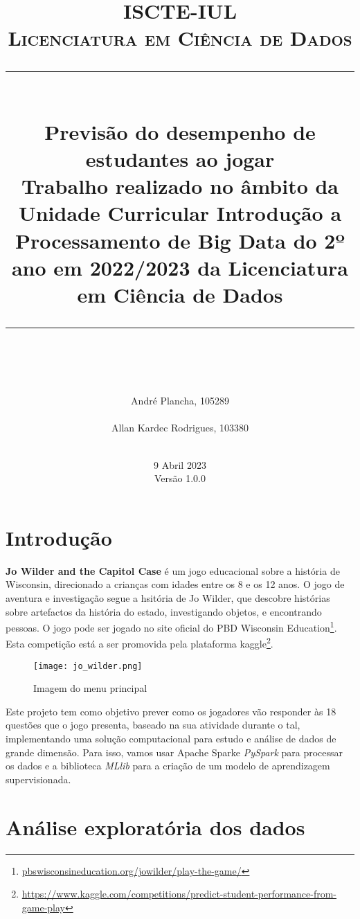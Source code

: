 \documentclass[justified, 11pt]{scrartcl}
\title{	
	\normalfont\normalsize
	\textsc{ISCTE-IUL \\ Licenciatura em Ciência de Dados}\\
	\vspace{20pt} 
	\rule{\linewidth}{0.5pt}\\
	\vspace{20pt}
	{\huge Previsão do desempenho de estudantes ao jogar}\\ 
  \vspace{16pt} 
  {\large Trabalho realizado no âmbito da Unidade Curricular Introdução a Processamento de Big Data do 2º ano em 2022/2023 da Licenciatura em Ciência de Dados}\\
	\vspace{12pt}
	\rule{\linewidth}{2pt}\\
	\vspace{20pt} 
}
\author{
  André Plancha, 105289 \\
  \email{Andre\_Plancha@iscte-iul.pt}\\
  Allan Kardec Rodrigues, 103380 \\
  \email{aksrs@iscte-iul.pt} \\
  \vspace{30pt}
}
\date{9 Abril 2023 \\ Versão 1.0.0}
\begin{document}
  \thispagestyle{empty}
  \maketitle
  \pagebreak
  \section{Introdução}
  \textbf{Jo Wilder and the Capitol Case} é um jogo educacional sobre a história de Wisconsin, direcionado a crianças com idades entre os 8 e os 12 anos. O jogo de aventura e investigação segue a hsitória de Jo Wilder, que descobre histórias sobre artefactos da história do estado, investigando objetos, e encontrando pessoas. O jogo pode ser jogado no site oficial do PBD Wisconsin Education\footnote{\url{pbswisconsineducation.org/jowilder/play-the-game/}}. Esta competição está a ser promovida pela plataforma kaggle\footnote{\url{https://www.kaggle.com/competitions/predict-student-performance-from-game-play}}.

  \begin{figure}[h]
    \centering
    \texttt{[image: jo\_wilder.png]}
    \caption{Imagem do menu principal}
    \label{fig:jo_wilder}
  \end{figure}

  Este projeto tem como objetivo prever como os jogadores vão responder às 18 questões que o jogo presenta, baseado na sua atividade durante o tal, implementando uma solução computacional para estudo e análise de dados de grande dimensão. Para isso, vamos usar Apache Spark\texttrademark e \textit{PySpark} para processar os dados e a biblioteca \textit{MLlib} para a criação de um modelo de aprendizagem supervisionada.

  \section{Análise exploratória dos dados}
  
\end{document}
